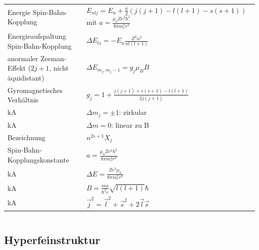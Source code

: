 \documentclass[12pt,a4paper]{article}
\renewcommand{\=}[1]{\stackrel{#1}{=}}
\theoremstyle{definition}
\theoremstyle{remark}
\begin{document}
\begin{center}
\begin{minipage}[t]{.35\linewidth}
\begin{tabular}{ll}
Energie Spin-Bahn-Kopplung & $E_{nlj} = E_n + \frac{a}{2} (j(j+1) - l(l+1) - s(s+1))$ mit $a = \frac{\mu_0 Z e^2 \hbar^2}{8\pi m_e^2 r^3}$\\
Energieaufspaltung Spin-Bahn-Kopplung & $\Delta E_{ls} = -E_n \frac{Z^2 \alpha^2}{n l (l+1)}$\\
anormaler Zeeman-Effekt ($2j+1$, nicht äquidistant) & $\Delta E_{m_j, {m_j - 1}} = g_j \mu_B B$\\
Gyromagnetisches Verhältnis & $g_j = 1+ \frac{j(j+1) + s(s+1) - l(l+1)}{2j(j+1)}$\\
kA & $\Delta m_j = \pm 1$: zirkular\\
kA & $\Delta m = 0$: linear zu B\\
Bezeichnung &  $n ^{2s+1}X_j$\\
Spin-Bahn-Kopplungskonstante & $a = \frac{\mu_0 Z e^2 \hbar^2}{8\pi m_e^2 r^3}$\\
kA & $\Delta E = \frac{Z e^2 \mu_0}{8 \pi m_e^2 r^3}$\\
kA & $B = \frac{ma}{\hbar^2 e} \sqrt{l(l+1)}\hbar$\\
kA & $\vec j^2 = \vec l^2 + \vec s^2 + 2 \vec l \vec s$\\
\bottomrule
\end{tabular}
\end{minipage}%
\begin{minipage}[t]{.65\linewidth}
\vspace{0pt}
\begin{tabular}{ll}
\toprule


\end{tabular}
\end{minipage}
\end{center}




\subsection{Hyperfeinstruktur}
\end{document}
